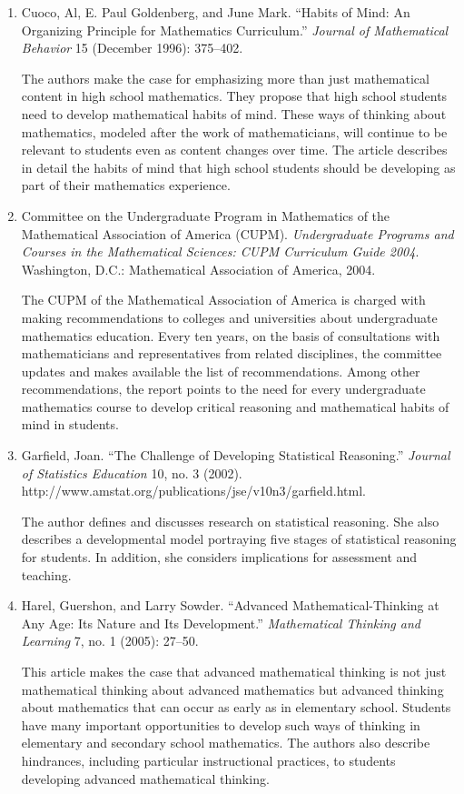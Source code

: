 \documentclass[
  10pt,
  a4paper,
  landscape,
  twoside,
  openany
]{scrbook}
\newcommand{\EN}[1]{#1}
\begin{document}
\TriPara
{
\EN{
  \begin{enumerate}
    \item Cuoco, Al, E. Paul Goldenberg, and June Mark. ``Habits of Mind: An Organizing Principle for Mathematics Curriculum.'' \emph{Journal of Mathematical Behavior} 15 (December 1996): 375--402.
    
      The authors make the case for emphasizing more than just mathematical content in high school mathematics. They propose that high school students need to develop mathematical habits of mind. These ways of thinking about mathematics, modeled after the work of mathematicians, will continue to be relevant to students even as content changes over time. The article describes in detail the habits of mind that high school students should be developing as part of their mathematics experience.

    \item Committee on the Undergraduate Program in Mathematics of the Mathematical Association of America (CUPM). \emph{Undergraduate Programs and Courses in the Mathematical Sciences: CUPM Curriculum Guide 2004}. Washington, D.C.: Mathematical Association of America, 2004.
    
      The CUPM of the Mathematical Association of America is charged with making recommendations to colleges and universities about undergraduate mathematics education. Every ten years, on the basis of consultations with mathematicians and representatives from related disciplines, the committee updates and makes available the list of recommendations. Among other recommendations, the report points to the need for every undergraduate mathematics course to develop critical reasoning and mathematical habits of mind in students.

    \item Garfield, Joan. ``The Challenge of Developing Statistical Reasoning.'' \emph{Journal of Statistics Education} 10, no. 3 (2002). http://www.amstat.org/publications/jse/v10n3/garfield.html.
    
      The author defines and discusses research on statistical reasoning. She also describes a developmental model portraying five stages of statistical reasoning for students. In addition, she considers implications for assessment and teaching.

    \item Harel, Guershon, and Larry Sowder. ``Advanced Mathematical-Thinking at Any Age: Its Nature and Its Development.'' \emph{Mathematical Thinking and Learning} 7, no. 1 (2005): 27--50.

      This article makes the case that advanced mathematical thinking is not just mathematical thinking about advanced mathematics but advanced thinking about mathematics that can occur as early as in elementary school. Students have many important opportunities to develop such ways of thinking in elementary and secondary school mathematics. The authors also describe hindrances, including particular instructional practices, to students developing advanced mathematical thinking.
  \end{enumerate}}
}
\end{document}
